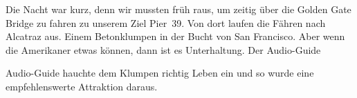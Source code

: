 Die Nacht war kurz, denn wir mussten früh raus, um zeitig über die Golden Gate Bridge zu fahren zu unserem Ziel Pier~39.
Von dort laufen die Fähren nach Alcatraz aus.
Einem Betonklumpen in der Bucht von San Francisco.
Aber wenn die Amerikaner etwas können, dann ist es Unterhaltung.
Der Audio-Guide


\vspace*{.27\paperheight}

\noindent
Audio-Guide hauchte dem Klumpen richtig Leben ein und so wurde eine empfehlenswerte Attraktion daraus.

\thispagestyle{empty}


